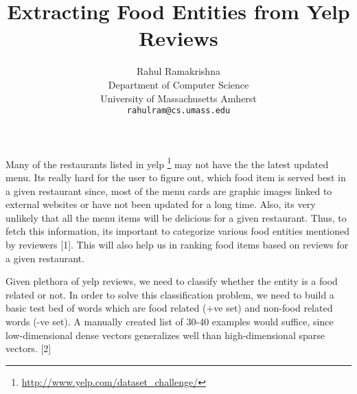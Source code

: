 \documentclass{article} %
\title{Extracting Food Entities from Yelp Reviews}
\author{
Rahul Ramakrishna \\
Department of Computer Science\\
University of Massachusetts Amherst\\
\texttt{rahulram@cs.umass.edu} \\
}
\begin{document}
\maketitle




Many of the restaurants listed in yelp \footnote{\url{http://www.yelp.com/dataset_challenge/}} may not have the the latest updated menu. Its really hard for the user to figure out, which food item is served best in a given restaurant since, most of the menu cards are graphic images linked to external websites or have not been updated for a long time. Also, its very unlikely that all the menu items will be delicious for a given restaurant. Thus, to fetch this information, its important to categorize various food entities mentioned by reviewers [1]. This will also help us in ranking food items based on reviews for a given restaurant. 

Given plethora of yelp reviews, we need to classify whether the entity is a food related or not. In order to solve this classification problem, we need to build a basic test bed of words which are food related (+ve set) and non-food related words (-ve set). A manually created list of 30-40 examples would suffice, since low-dimensional dense vectors generalizes well than high-dimensional sparse vectors. [2]
\end{document}
